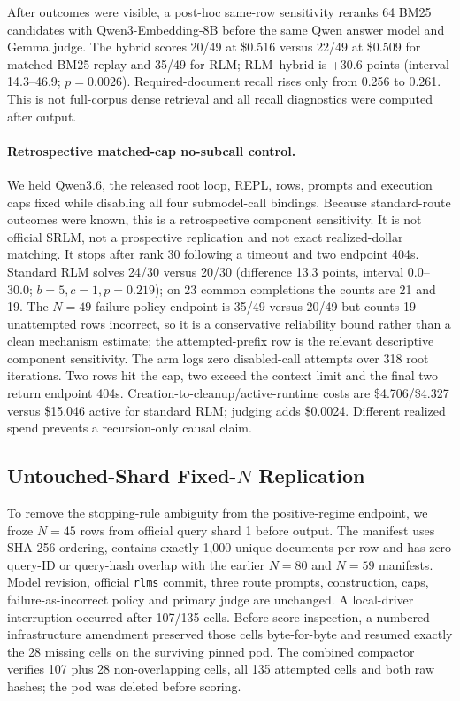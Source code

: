 \documentclass[letterpaper]{article}
\begin{document}
After outcomes were visible, a post-hoc same-row sensitivity reranks 64 BM25 candidates with Qwen3-Embedding-8B before the same Qwen answer model and Gemma judge. The hybrid scores 20/49 at \$0.516 versus 22/49 at \$0.509 for matched BM25 replay and 35/49 for RLM; RLM--hybrid is +30.6 points (interval 14.3--46.9; $p{=}0.0026$). Required-document recall rises only from 0.256 to 0.261. This is not full-corpus dense retrieval and all recall diagnostics were computed after output.

\paragraph{Retrospective matched-cap no-subcall control.}
We held Qwen3.6, the released root loop, REPL, rows, prompts and execution caps fixed while disabling all four submodel-call bindings. Because standard-route outcomes were known, this is a retrospective component sensitivity. It is not official SRLM, not a prospective replication and not exact realized-dollar matching. It stops after rank 30 following a timeout and two endpoint 404s. Standard RLM solves 24/30 versus 20/30 (difference 13.3 points, interval 0.0--30.0; $b{=}5,c{=}1,p{=}0.219$); on 23 common completions the counts are 21 and 19. The $N{=}49$ failure-policy endpoint is 35/49 versus 20/49 but counts 19 unattempted rows incorrect, so it is a conservative reliability bound rather than a clean mechanism estimate; the attempted-prefix row is the relevant descriptive component sensitivity. The arm logs zero disabled-call attempts over 318 root iterations. Two rows hit the cap, two exceed the context limit and the final two return endpoint 404s. Creation-to-cleanup/active-runtime costs are \$4.706/\$4.327 versus \$15.046 active for standard RLM; judging adds \$0.0024. Different realized spend prevents a recursion-only causal claim.

\subsection{Untouched-Shard Fixed-$N$ Replication}

To remove the stopping-rule ambiguity from the positive-regime endpoint, we
froze $N{=}45$ rows from official query shard 1 before output. The manifest
uses SHA-256 ordering, contains exactly 1,000 unique documents per row and has
zero query-ID or query-hash overlap with the earlier $N{=}80$ and $N{=}59$
manifests. Model revision, official \texttt{rlms} commit, three route prompts,
construction, caps, failure-as-incorrect policy and primary judge are
unchanged. A local-driver interruption occurred after 107/135 cells. Before
score inspection, a numbered infrastructure amendment preserved those cells
byte-for-byte and resumed exactly the 28 missing cells on the surviving
pinned pod. The combined compactor verifies 107 plus 28 non-overlapping cells,
all 135 attempted cells and both raw hashes; the pod was deleted before
scoring.
\end{document}
